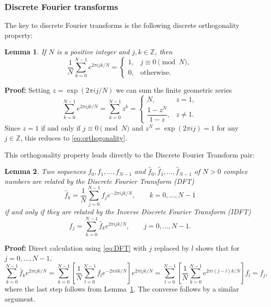\documentclass[12pt]{article}
\newtheorem{lemma}{Lemma}
\newenvironment{proof}{\par\noindent\textbf{Proof: }}{\hfill\qed\par}
\newcommand{\qed}{\fbox{\rule[-0.0ex]{0pt}{1.5ex}\hspace*{0.1em}}}
\newcommand{\Z}{\mathbb{Z}}
\newcommand{\dfc}[1]{\widehat{#1}}  %
\begin{document}
\pagebreak[1]
\subsubsection{Discrete Fourier transforms}

The key to discrete Fourier transforms is the following discrete orthogonality
property:

\begin{lemma}\label{lemma:orthogonality}
If $N$ is a positive integer and $j,k\in\Z$, then
\begin{equation}
   \frac{1}{N} \sum_{k=0}^{N-1} e^{2\pi ijk/N} = \begin{cases}
      1, & \text{$j\equiv 0\pmod{N}$}, \\
      0, & \text{otherwise}.
   \end{cases}
\label{eq:orthogonality}
\end{equation}
\end{lemma}
\begin{proof}
Setting $z=\exp(2\pi ij/N)$ we can sum the finite geometric series
\begin{equation}
   \sum_{k=0}^{N-1} e^{2\pi ijk/N} 
               = \sum_{k=0}^{N-1} z^{k} 
               = \begin{cases} N,    & \text{$z=1$},\\
                 \dfrac{1-z^N}{1-z}, & \text{$z\ne1$}. \end{cases}
\end{equation}
Since $z=1$ if and only if $j\equiv0\pmod{N}$ and $z^N = \exp(2\pi ij)=1$ for
any $j\in\Z$, this reduces to \eqref{eq:orthogonality}.
\end{proof}
This orthogonality property leads directly to the Discrete Fourier
Transform pair:
\begin{lemma}\label{lemma:DFT}
Two sequences $f_0,f_1,\dots,f_{N-1}$ and
$\dfc{f}_0,\dfc{f}_1,\dots,\dfc{f}_{N-1}$ of $N>0$ complex numbers are related
by the Discrete Fourier Transform (DFT)
\begin{equation}
   \dfc{f}_k = \frac{1}{N} \sum_{j=0}^{N-1} f_j e^{-2\pi ijk/N},
\qquad k=0,\dots,N-1 
\label{eq:DFT}
\end{equation}
if and only if they are related by the Inverse Discrete Fourier Transform 
(IDFT)
\begin{equation}
   f_j = \sum_{k=0}^{N-1} \dfc{f}_k e^{2\pi ijk/N},
\qquad j=0,\dots,N-1 .
\label{eq:IDFT}
\end{equation}
\end{lemma}
\begin{proof}
Direct calculation using \eqref{eq:DFT} with $j$ replaced by $l$ shows that
for $j=0,\dots,N-1$,
\begin{equation}
   \sum_{k=0}^{N-1} \dfc{f}_k e^{2\pi ijk/N}
   = \sum_{k=0}^{N-1} \left[
      \frac{1}{N} \sum_{l=0}^{N-1} f_l e^{-2\pi ilk/N}\right] e^{2\pi
ijk/N}
   = \sum_{l=0}^{N-1} \left[
      \frac{1}{N} \sum_{k=0}^{N-1} e^{2\pi i(j-l)k/N}\right] f_l = f_j,
\end{equation}
where the last step follows from Lemma~\ref{lemma:orthogonality}.
The converse follows by a similar argument.
\end{proof}
\end{document}

